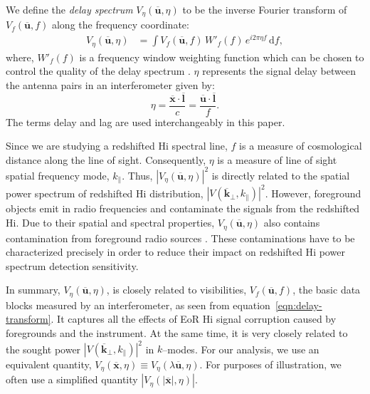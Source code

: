 \documentclass[preprint2,iop,numberedappendix]{emulateapj}
\newcommand{\dif}{\mathrm{d}}
\begin{document}
We define the {\it delay spectrum} $V_\eta(\overline{\mathbf{u}},\eta)$ to be the inverse Fourier transform of $V_f(\overline{\mathbf{u}},f)$ along the frequency coordinate:
\begin{align}\label{eqn:delay-transform}
  V_\eta(\overline{\mathbf{u}},\eta) &= \int V_f(\overline{\mathbf{u}},f)\,W'_f(f)\,e^{i2\pi\eta f}\,\dif f,
\end{align}
where, $W'_f(f)$ is a frequency window weighting function which can be chosen to control the quality of the delay spectrum \citep{thy13,ved12}. $\eta$ represents the signal delay between the antenna pairs in an interferometer given by:
\begin{equation}\label{eqn:delay}
  \eta = \frac{\overline{\mathbf{x}}\cdot\overline{\mathbf{l}}}{c} = \frac{\overline{\mathbf{u}}\cdot\overline{\mathbf{l}}}{f}.
\end{equation}
The terms delay and lag are used interchangeably in this paper.

Since we are studying a redshifted H{\sc i} spectral line, $f$ is a measure of cosmological distance along the line of sight. Consequently, $\eta$ is a measure of line of sight spatial frequency mode, $k_\parallel$. Thus, $|V_\eta(\overline{\mathbf{u}},\eta)|^2$ is directly related to the spatial power spectrum of redshifted H{\sc i} distribution, $|V(\overline{\mathbf{k}}_\perp,k_\parallel)|^2$. However, foreground objects emit in radio frequencies and contaminate the signals from the redshifted H{\sc i}. Due to their spatial and spectral properties, $V_\eta(\overline{\mathbf{u}},\eta)$ also contains contamination from foreground radio sources \citep{thy13,tro12,mor12,bow09}. These contaminations have to be characterized precisely in order to reduce their impact on redshifted H{\sc i} power spectrum detection sensitivity. 

In summary, $V_\eta(\overline{\mathbf{u}},\eta)$, is closely related to visibilities, $V_f(\overline{\mathbf{u}},f)$, the basic data blocks measured by an interferometer, as seen from equation~\ref{eqn:delay-transform}. It captures all the effects of EoR H{\sc i} signal corruption caused by foregrounds and the instrument. At the same time, it is very closely related to the sought power $|V(\overline{\mathbf{k}}_\perp,k_\parallel)|^2$ in $k$--modes. For our analysis, we use an equivalent quantity, $V_\eta(\overline{\mathbf{x}},\eta) \equiv V_\eta(\lambda\overline{\mathbf{u}},\eta)$. For purposes of illustration, we often use a simplified quantity $|V_\eta(|\overline{\mathbf{x}}|,\eta)|$.
\end{document}
